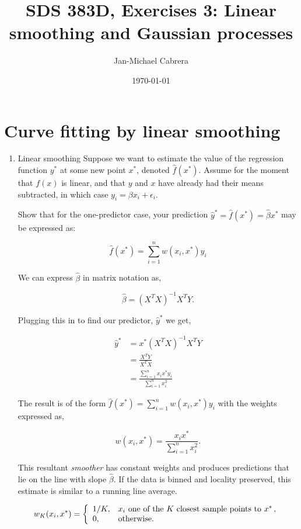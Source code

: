 \documentclass[10pt]{article}
\begin{document}
    \title{SDS 383D, Exercises 3: Linear smoothing and Gaussian processes}
    \author{Jan-Michael Cabrera}
    \date{\today}
    \maketitle

    \section*{Curve fitting by linear smoothing}

    \begin{enumerate}[label=(\Alph*)]
      \item Linear smoothing
        Suppose we want to estimate the value of the regression function $y^*$ at some new point $x^*$, denoted $\hat{f}(x^*)$. Assume for the moment that $f(x)$ is linear, and that $y$ and $x$ have already had their means subtracted, in which case $y_i = \beta x_i + \epsilon_i$.

        Show that for the one-predictor case, your prediction $\hat{y}^* = \hat{f}(x^*) = \hat{\beta} x^*$ may be expressed as:

        $$\hat{f}(x^*) = \sum_{i=1}^n w(x_i, x^*) y_i$$

        We can express $\hat{\beta}$ in matrix notation as,

        $$\hat{\beta} = (X^T X)^{-1} X^T Y.$$

        Plugging this in to find our predictor, $\hat{y}^*$ we get,

        \begin{align*}
            \hat{y}^* &= x^* (X^T X)^{-1} X^T Y \\
            &= \frac{X^T Y}{X^T X} \\
            &= \frac{\sum_{i=1}^n x_i x^* y_i}{\sum_{i=1}^n x_i^2}
        \end{align*}

        The result is of the form $\hat{f}(x^*) = \sum_{i=1}^n w(x_i, x^*) y_i$ with the weights expressed as,

        $$w(x_i, x^*) = \frac{x_i x^*}{\sum_{i=1}^n x_i^2}.$$

        This resultant \textit{smoother} has constant weights and produces predictions that lie on the line with slope $\hat{\beta}$. If the data is binned and locality preserved, this estimate is similar to a running line average.

        $$
        w_K(x_i, x^*) = \left \{
        \begin{array}{l l}
        1/K, & \mbox{$x_i$ one of the $K$ closest sample points to $x^*$} \, ,\\
        0, & \mbox{otherwise.} \\
        \end{array}
        \right.
        $$


\end{enumerate}
\end{document}
